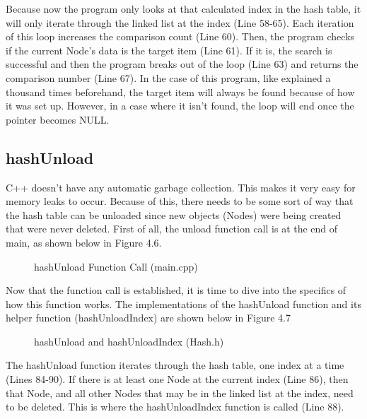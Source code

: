 \documentclass[letterpaper, 10pt]{article}
\begin{document}
\vspace{1em}

\noindent
Because now the program only looks at that calculated index in the hash table, it will only iterate through the linked list at the index (Line 58-65). Each iteration of this loop increases the comparison count (Line 60). Then, the program checks if the current Node's data is the target item (Line 61). If it is, the search is successful and then the program breaks out of the loop (Line 63) and returns the comparison number (Line 67). In the case of this program, like explained a thousand times beforehand, the target item will always be found because of how it was set up. However, in a case where it isn't found, the loop will end once the pointer becomes NULL.

\subsection{hashUnload}
\noindent
C++ doesn't have any automatic garbage collection. This makes it very easy for memory leaks to occur. Because of this, there needs to be some sort of way that the hash table can be unloaded since new objects (Nodes) were being created that were never deleted. First of all, the unload function call is at the end of main, as shown below in Figure 4.6.

\begin{figure}[H]
  \centering
  
  \caption{hashUnload Function Call (main.cpp)}
  \label{fig:figure4.6}
\end{figure}

\noindent
Now that the function call is established, it is time to dive into the specifics of how this function works. The implementations of the hashUnload function and its helper function (hashUnloadIndex) are shown below in Figure 4.7

\begin{figure}[H]
  \centering
  
  \caption{hashUnload and hashUnloadIndex (Hash.h)}
  \label{fig:figure4.7}
\end{figure}

\noindent
The hashUnload function iterates through the hash table, one index at a time (Lines 84-90). If there is at least one Node at the current index (Line 86), then that Node, and all other Nodes that may be in the linked list at the index, need to be deleted. This is where the hashUnloadIndex function is called (Line 88).
\end{document}
